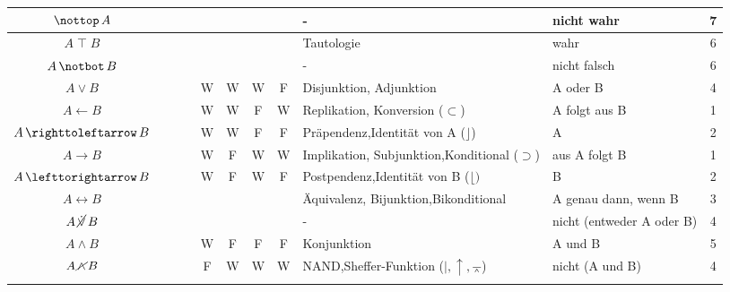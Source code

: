 \documentclass[english,ngerman,parskip=half,headsepline,footsepline]{scrreprt}
\newcommand{\WWtrue}{W}
\newcommand{\WWfalse}{F}
\newcommand{\lnutrue}{\operatorname{\nottop}}  %
\newcommand{\lbtrue}{\operatorname{\top}}              %
\newcommand{\lnbfalse}{\operatorname{\notbot}}         %
\newcommand{\lnxor}{\operatorname{\cancel{\lxor}}}     %
\newcommand{\lleftimp}{\operatorname{\leftarrow}}      %
\newcommand{\lleft}{\operatorname{\righttoleftarrow}}  %
\newcommand{\limp}{\operatorname{\rightarrow}}         %
\newcommand{\lright}{\operatorname{\lefttorightarrow}} %
\newcommand{\lequiv}{\operatorname{\leftrightarrow}}   %
\newcommand{\lnand}{\operatorname{\cancel{\land}}}     %
\newcommand{\lxor}{\operatorname{\dot{\lor}}}          %
\begin{document}
\begin{table}
\begin{threeparttable}
\begin{tabularx}{\linewidth}{c||c:cc:cccc|X:X|c|}
			\gapline %
			$\lnutrue A$&&&&&&&&-&nicht wahr&7\\
			\hline %
			$A\lbtrue B$&&&&\mrW&\mrW&\mrW&\mrW&Tautologie&wahr&6\\
			\gapline %
			$A\lnbfalse B$&&&&&&&&-&nicht falsch&6\\
			\tableline %
			$A\lor B$&&&&\WWtrue&\WWtrue&\WWtrue&\WWfalse&Disjunktion, Adjunktion&A oder B&4\\
			\tableline %
			$A\lleftimp B$&&&&\WWtrue&\WWtrue&\WWfalse&\WWtrue&Replikation, Konversion ($\subset$)&A folgt aus B&1\\
			\tableline %
			$A\lleft B$&&&&\WWtrue&\WWtrue&\WWfalse&\WWfalse&Präpendenz,\newline Identität von A ($\rfloor$)&A&2\\
			\tablegroup %
			$A\limp B$&&&&\WWtrue&\WWfalse&\WWtrue&\WWtrue&Implikation, Subjunktion,\newline Konditional ($\supset$)&aus A folgt B&1\\
			\tableline %
			$A\lright B$&&&&\WWtrue&\WWfalse&\WWtrue&\WWfalse&Postpendenz,\newline Identität von B ($\lfloor)$&B&2\\
			\tableline %
			$A\lequiv B$&&&&\mrW&\mrF&\mrF&\mrW&Äquivalenz, Bijunktion,\newline Bikonditional&A genau dann, wenn B&3\\
			\gapline %
			$A\lnxor B$&&&&&&&&-&nicht (entweder A oder B) &4\\
			\tableline %
			$A\land B$&&&&\WWtrue&\WWfalse&\WWfalse&\WWfalse&Konjunktion&A und B&5\\
			\tablegroup %
			$A\lnand B$&&&&\WWfalse&\WWtrue&\WWtrue&\WWtrue&NAND,\newline Sheffer-Funktion ($\mid, \uparrow, \barwedge$)&nicht (A und B) &4\\
			\tableline %

\end{tabularx}
\end{threeparttable}
\end{table}
\end{document}
